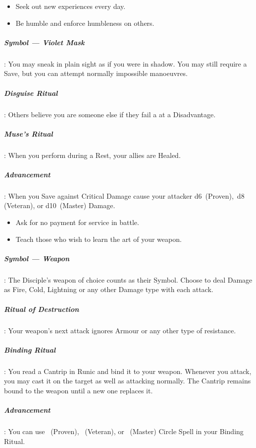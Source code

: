 \documentclass[itdr]{subfiles}
\begin{document}
\vfill
\break

{\em\begin{itemize}
		\item Seek out new experiences every day.
		\item Be humble and enforce humbleness on others.
\end{itemize}}

\subparagraph{Symbol --- Violet Mask}: You may sneak in plain sight as if you were in shadow. You may still require a Save, but you can attempt normally impossible manoeuvres.

\subparagraph{Disguise Ritual}: Others believe you are someone else if they fail a  at a Disadvantage.

\subparagraph{Muse's Ritual}: When you perform during a Rest, your allies are Healed.

\subparagraph{Advancement}: When you Save against Critical Damage cause your attacker d6~(Proven),~d8 (Veteran), or d10~(Master) Damage.

\vspace{1em}

{\em\begin{itemize}
		\item Ask for no payment for service in battle.
		\item Teach those who wish to learn the art of your weapon.
\end{itemize}}

\subparagraph{Symbol --- Weapon}: The Disciple's weapon of choice counts as their Symbol. Choose to deal Damage as Fire, Cold, Lightning or any other Damage type with each attack.

\subparagraph{Ritual of Destruction}: Your weapon's next attack ignores Armour or any other type of resistance.

\subparagraph{Binding Ritual}: You read a Cantrip in Runic and bind it to your weapon. Whenever you attack, you may cast it on the target as well as attacking normally. The Cantrip remains bound to the weapon until a new one replaces it.

\subparagraph{Advancement}: You can use ~(Proven), ~(Veteran), or ~(Master) Circle Spell in your Binding Ritual.

\vfill

\begin{comment}

\creed{???}
{\em\begin{itemize}
\item ???
\item ???
\end{itemize}}

\subparagraph{Symbol --- ???}:

\subparagraph{??? Ritual}:

\subparagraph{??? Ritual}:

\subparagraph{Advancement}:

\end{comment}
\end{document}
